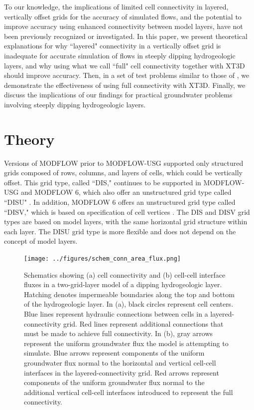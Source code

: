 \documentclass{article}
\begin{document}
To our knowledge, the implications of limited cell connectivity in layered, vertically offset grids for the accuracy of simulated flows, and the potential to improve accuracy using enhanced connectivity between model layers, have not been previously recognized or investigated. In this paper, we present theoretical explanations for why ``layered" connectivity in a vertically offset grid is inadequate for accurate simulation of flows in steeply dipping hydrogeologic layers, and why using what we call ``full" cell connectivity together with XT3D should improve accuracy. Then, in a set of test problems similar to those of \cite{bardot2022}, we demonstrate the effectiveness of using full connectivity with XT3D. Finally, we discuss the implications of our findings for practical groundwater problems involving steeply dipping hydrogeologic layers.

\section{Theory}

Versions of MODFLOW prior to MODFLOW-USG \citep{modflowusg} supported only structured grids composed of rows, columns, and layers of cells, which could be vertically offset. This grid type, called ``DIS," continues to be supported in MODFLOW-USG and MODFLOW 6, which also offer an unstructured grid type called ``DISU" \citep{modflowusg, modflow6gwf}. In addition, MODFLOW 6 offers an  unstructured grid type called ``DISV," which is based on specification of cell vertices \citep{modflow6gwf}. The DIS and DISV grid types are based on model layers, with the same horizontal grid structure within each layer. The DISU grid type is more flexible and does not depend on the concept of model layers.

\begin{figure}
	\begin{center}
	\texttt{[image: ../figures/schem\_conn\_area\_flux.png]}
	\caption{Schematics showing (a) cell connectivity and (b) cell-cell interface fluxes in a two-grid-layer model of a dipping hydrogeologic layer. Hatching denotes impermeable boundaries along the top and bottom of the hydrogeologic layer. In (a), black circles represent cell centers. Blue lines represent hydraulic connections between cells in a layered-connectivity grid. Red lines represent additional connections that must be made to achieve full connectivity. In (b), gray arrows represent the uniform groundwater flux the model is attempting to simulate. Blue arrows represent components of the uniform groundwater flux normal to the horizontal and vertical cell-cell interfaces in the layered-connectivity grid. Red arrows represent components of the uniform groundwater flux normal to the additional vertical cell-cell interfaces introduced to represent the full connectivity.}
	\label{fig:schem-conn-area-flux}
	\end{center}
\end{figure}
\end{document}
